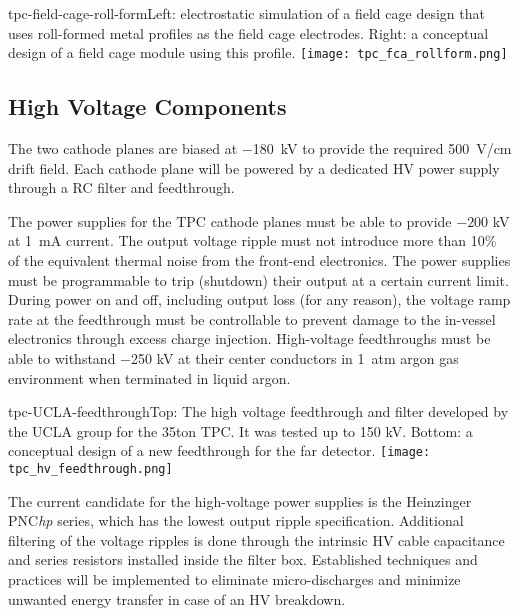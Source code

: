\begin{cdrfigure}{tpc-field-cage-roll-form}{Left: electrostatic simulation of a field cage design that uses roll-formed metal profiles as the field cage electrodes.  Right: a conceptual design of a field cage module using this profile.}
\texttt{[image: tpc\_fca\_rollform.png]}
\end{cdrfigure}


\subsection{High Voltage Components}  
\label{subsec:fd-ref-hv}
   
The two cathode planes are biased at $-$180~kV to provide the required 
500~V/cm drift field. Each cathode plane will be powered by a dedicated HV power supply through a RC filter and feedthrough.

The power supplies for the TPC cathode planes must be able to provide $-200$ kV at 1~mA current. The output voltage ripple 
must not introduce more than 10\% of the equivalent thermal noise from the front-end electronics. 
The power supplies must be programmable to trip (shutdown) their output at a certain current limit.  During power on and off, 
including output loss (for any reason), the voltage ramp rate at the feedthrough must be controllable to prevent 
damage to the in-vessel electronics through excess charge injection.  High-voltage feedthroughs must be able to withstand $-$250 kV 
at their center conductors in 1~atm argon gas environment when terminated in liquid argon.

\begin{cdrfigure}{tpc-UCLA-feedthrough}{Top: The high voltage feedthrough and filter developed by the UCLA 
group for the 35ton TPC.  It was tested up to 150 kV.  Bottom: a conceptual design of a new feedthrough for the far detector.}
\texttt{[image: tpc\_hv\_feedthrough.png]}
\end{cdrfigure}

The current candidate for the high-voltage power supplies is 
the Heinzinger PNC{\it hp} series, which has the lowest output ripple specification.  Additional filtering of the voltage ripples is done through the intrinsic HV cable capacitance and series resistors installed inside the filter box. Established techniques and practices will be implemented to eliminate micro-discharges and minimize unwanted energy transfer in case of an HV breakdown. 
  
